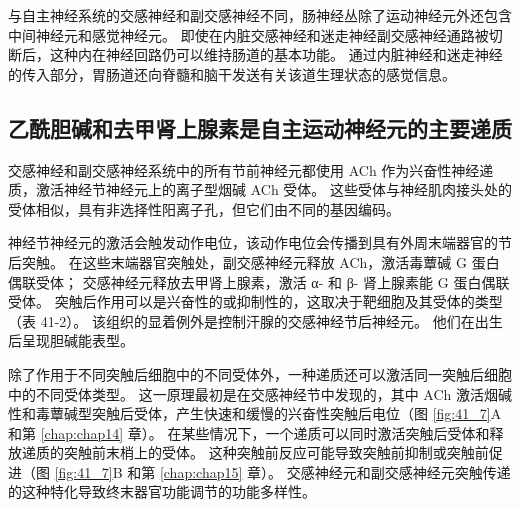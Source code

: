 与自主神经系统的交感神经和副交感神经不同，肠神经丛除了运动神经元外还包含中间神经元和感觉神经元。 即使在内脏交感神经和迷走神经副交感神经通路被切断后，这种内在神经回路仍可以维持肠道的基本功能。 通过内脏神经和迷走神经的传入部分，胃肠道还向脊髓和脑干发送有关该道生理状态的感觉信息。

\subsection{乙酰胆碱和去甲肾上腺素是自主运动神经元的主要递质}
交感神经和副交感神经系统中的所有节前神经元都使用 ACh 作为兴奋性神经递质，激活神经节神经元上的离子型烟碱 ACh 受体。 这些受体与神经肌肉接头处的受体相似，具有非选择性阳离子孔，但它们由不同的基因编码。

神经节神经元的激活会触发动作电位，该动作电位会传播到具有外周末端器官的节后突触。 在这些末端器官突触处，副交感神经元释放 ACh，激活毒蕈碱 G 蛋白偶联受体； 交感神经元释放去甲肾上腺素，激活 α- 和 β- 肾上腺素能 G 蛋白偶联受体。 突触后作用可以是兴奋性的或抑制性的，这取决于靶细胞及其受体的类型（表 41-2）。 该组织的显着例外是控制汗腺的交感神经节后神经元。 他们在出生后呈现胆碱能表型。

除了作用于不同突触后细胞中的不同受体外，一种递质还可以激活同一突触后细胞中的不同受体类型。 
这一原理最初是在交感神经节中发现的，其中 ACh 激活烟碱性和毒蕈碱型突触后受体，产生快速和缓慢的兴奋性突触后电位（图 \ref{fig:41_7}A 和第 \ref{chap:chap14} 章）。 
在某些情况下，一个递质可以同时激活突触后受体和释放递质的突触前末梢上的受体。 这种突触前反应可能导致突触前抑制或突触前促进（图 \ref{fig:41_7}B 和第 \ref{chap:chap15} 章）。 交感神经元和副交感神经元突触传递的这种特化导致终末器官功能调节的功能多样性。


